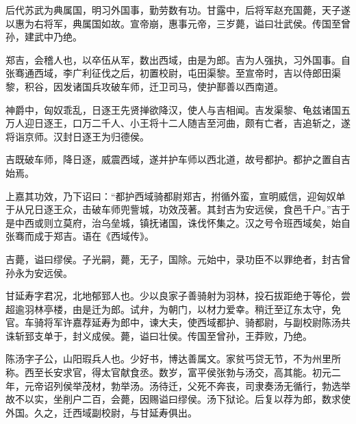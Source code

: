 \documentclass[12pt,UTF8]{ctexbook}
\begin{document}
后代苏武为典属国，明习外国事，勤劳数有功。甘露中，后将军赵充国薨，天子遂以惠为右将军，典属国如故。宣帝崩，惠事元帝，三岁薨，谥曰壮武侯。传国至曾孙，建武中乃绝。



郑吉，会稽人也，以卒伍从军，数出西域，由是为郎。吉为人强执，习外国事。自张骞通西域，李广利征伐之后，初置校尉，屯田渠黎。至宣帝时，吉以侍郎田渠黎，积谷，因发诸国兵攻破车师，迁卫司马，使护鄯善以西南道。



神爵中，匈奴乖乱，日逐王先贤掸欲降汉，使人与吉相闻。吉发渠黎、龟兹诸国五万人迎日逐王，口万二千人、小王将十二人随吉至河曲，颇有亡者，吉追斩之，遂将诣京师。汉封日逐王为归德侯。



吉既破车师，降日逐，威震西域，遂并护车师以西北道，故号都护。都护之置自吉始焉。



上嘉其功效，乃下诏曰：“都护西域骑都尉郑吉，拊循外蛮，宣明威信，迎匈奴单于从兄日逐王众，击破车师兜訾城，功效茂著。其封吉为安远侯，食邑千户。”吉于是中西或则立莫府，治乌垒城，镇抚诸国，诛伐怀集之。汉之号令班西域矣，始自张骞而成于郑吉。语在《西域传》。



吉薨，谥曰缪侯。子光嗣，薨，无子，国除。元始中，录功臣不以罪绝者，封吉曾孙永为安远侯。



甘延寿字君况，北地郁郅人也。少以良家子善骑射为羽林，投石拔距绝于等伦，尝超逾羽林亭楼，由是迁为郎。试弁，为朝门，以材力爱幸。稍迁至辽东太守，免官。车骑将军许嘉荐延寿为郎中，谏大夫，使西域都护、骑都尉，与副校尉陈汤共诛斩郅支单于，封义成侯。薨，谥曰壮侯。传国至曾孙，王莽败，乃绝。



陈汤字子公，山阳瑕兵人也。少好书，博达善属文。家贫丐贷无节，不为州里所称。西至长安求官，得太官献食丞。数岁，富平侯张勃与汤交，高其能。初元二年，元帝诏列侯举茂材，勃举汤。汤待迁，父死不奔丧，司隶奏汤无循行，勃选举故不以实，坐削户二百，会薨，因赐谥曰缪侯。汤下狱论。后复以荐为郎，数求使外国。久之，迁西域副校尉，与甘延寿俱出。
\end{document}
